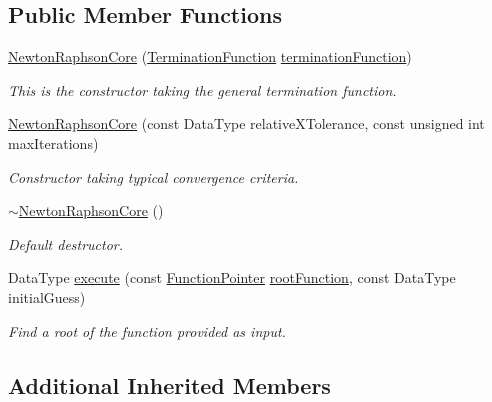 \subsection*{Public Member Functions}
\begin{DoxyCompactItemize}
\item 
\hyperlink{classtudat_1_1root__finders_1_1NewtonRaphsonCore_a75558d03909dc64951a997088e4cfdf0}{Newton\+Raphson\+Core} (\hyperlink{classtudat_1_1root__finders_1_1NewtonRaphsonCore_afcac89fdbf9dff9b8233cfa271edc19d}{Termination\+Function} \hyperlink{classtudat_1_1root__finders_1_1RootFinderCore_a7a1efe7ce979318d398b4bb8574e70d6}{termination\+Function})
\begin{DoxyCompactList}\small\item\em This is the constructor taking the general termination function. \end{DoxyCompactList}\item 
\hyperlink{classtudat_1_1root__finders_1_1NewtonRaphsonCore_a8c0189e16dffee9d55f7f70eeb58d94d}{Newton\+Raphson\+Core} (const Data\+Type relative\+X\+Tolerance, const unsigned int max\+Iterations)
\begin{DoxyCompactList}\small\item\em Constructor taking typical convergence criteria. \end{DoxyCompactList}\item 
\hyperlink{classtudat_1_1root__finders_1_1NewtonRaphsonCore_ad12e7cc490221d0d3387c075a4318d28}{$\sim$\+Newton\+Raphson\+Core} ()
\begin{DoxyCompactList}\small\item\em Default destructor. \end{DoxyCompactList}\item 
Data\+Type \hyperlink{classtudat_1_1root__finders_1_1NewtonRaphsonCore_a292a69a9f5905e29171638837e0ec1f6}{execute} (const \hyperlink{classtudat_1_1root__finders_1_1NewtonRaphsonCore_a33d0c83c99670045066d67b92458757d}{Function\+Pointer} \hyperlink{classtudat_1_1root__finders_1_1RootFinderCore_afbe57f7fa3baba13128d9dc2ca41dedd}{root\+Function}, const Data\+Type initial\+Guess)
\begin{DoxyCompactList}\small\item\em Find a root of the function provided as input. \end{DoxyCompactList}\end{DoxyCompactItemize}
\subsection*{Additional Inherited Members}


